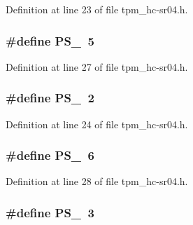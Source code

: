 Definition at line 23 of file tpm\+\_\+hc-\/sr04.\+h.

\subsubsection[{\texorpdfstring{P\+S\+\_\+32}{PS_32}}]{\setlength{\rightskip}{0pt plus 5cm}\#define P\+S\+\_~5}\hypertarget{tpm__hc-sr04_8h_a58d367baac81af0dd63111e2faab6c8e}{}\label{tpm__hc-sr04_8h_a58d367baac81af0dd63111e2faab6c8e}


Definition at line 27 of file tpm\+\_\+hc-\/sr04.\+h.

\subsubsection[{\texorpdfstring{P\+S\+\_\+4}{PS_4}}]{\setlength{\rightskip}{0pt plus 5cm}\#define P\+S\+\_~2}\hypertarget{tpm__hc-sr04_8h_ab8927f9c31e0bc98758bbf90c7e852b3}{}\label{tpm__hc-sr04_8h_ab8927f9c31e0bc98758bbf90c7e852b3}


Definition at line 24 of file tpm\+\_\+hc-\/sr04.\+h.

\subsubsection[{\texorpdfstring{P\+S\+\_\+64}{PS_64}}]{\setlength{\rightskip}{0pt plus 5cm}\#define P\+S\+\_~6}\hypertarget{tpm__hc-sr04_8h_ada495be9420499b4fb148b98ac01731e}{}\label{tpm__hc-sr04_8h_ada495be9420499b4fb148b98ac01731e}


Definition at line 28 of file tpm\+\_\+hc-\/sr04.\+h.

\subsubsection[{\texorpdfstring{P\+S\+\_\+8}{PS_8}}]{\setlength{\rightskip}{0pt plus 5cm}\#define P\+S\+\_~3}\hypertarget{tpm__hc-sr04_8h_a83eab3432f78f8041d140048f9bdc159}{}\label{tpm__hc-sr04_8h_a83eab3432f78f8041d140048f9bdc159}


